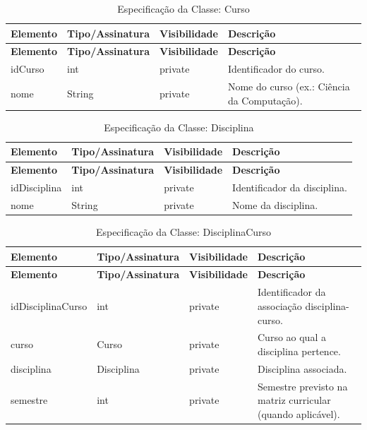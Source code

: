 \fonteautores

\vspace{\baselineskip}

\Needspace{0.32\textheight}
\begin{longtable}{|L{3.5cm}|L{3.5cm}|L{3.5cm}|L{3.5cm}|}
\caption{Especificação da Classe: Curso} \\
\hline
\textbf{Elemento} & \textbf{Tipo/Assinatura} & \textbf{Visibilidade} & \textbf{Descrição} \\
\hline
\endfirsthead
\hline
\textbf{Elemento} & \textbf{Tipo/Assinatura} & \textbf{Visibilidade} & \textbf{Descrição} \\
\hline
\endhead
idCurso & int & private & Identificador do curso. \\
\hline
nome & String & private & Nome do curso (ex.: Ciência da Computação). \\
\hline
\end{longtable}

\fonteautores

\vspace{\baselineskip}

\Needspace{0.32\textheight}
\begin{longtable}{|L{3.5cm}|L{3.5cm}|L{3.5cm}|L{3.5cm}|}
\caption{Especificação da Classe: Disciplina} \\
\hline
\textbf{Elemento} & \textbf{Tipo/Assinatura} & \textbf{Visibilidade} & \textbf{Descrição} \\
\hline
\endfirsthead
\hline
\textbf{Elemento} & \textbf{Tipo/Assinatura} & \textbf{Visibilidade} & \textbf{Descrição} \\
\hline
\endhead
idDisciplina & int & private & Identificador da disciplina. \\
\hline
nome & String & private & Nome da disciplina. \\
\hline
\end{longtable}

\fonteautores

\vspace{\baselineskip}

\Needspace{0.32\textheight}
\begin{longtable}{|L{3.5cm}|L{3.5cm}|L{3.5cm}|L{3.5cm}|}
\caption{Especificação da Classe: DisciplinaCurso} \\
\hline
\textbf{Elemento} & \textbf{Tipo/Assinatura} & \textbf{Visibilidade} & \textbf{Descrição} \\
\hline
\endfirsthead
\hline
\textbf{Elemento} & \textbf{Tipo/Assinatura} & \textbf{Visibilidade} & \textbf{Descrição} \\
\hline
\endhead
idDisciplinaCurso & int & private & Identificador da associação disciplina-curso. \\
\hline
curso & Curso & private & Curso ao qual a disciplina pertence. \\
\hline
disciplina & Disciplina & private & Disciplina associada. \\
\hline
semestre & int & private & Semestre previsto na matriz curricular (quando aplicável). \\
\hline
\end{longtable}

